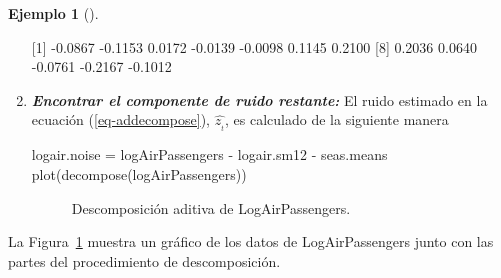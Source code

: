 \documentclass[
  us-letterpaper,
]{scrreprt}
\newenvironment{Shaded}{\begin{snugshade}}{\end{snugshade}}
\newcommand{\DecValTok}[1]{\textcolor[rgb]{0.68,0.00,0.00}{#1}}
\newcommand{\FloatTok}[1]{\textcolor[rgb]{0.68,0.00,0.00}{#1}}
\newcommand{\FunctionTok}[1]{\textcolor[rgb]{0.28,0.35,0.67}{#1}}
\newcommand{\NormalTok}[1]{\textcolor[rgb]{0.00,0.23,0.31}{#1}}
\newcommand{\OtherTok}[1]{\textcolor[rgb]{0.00,0.23,0.31}{#1}}
\newcommand{\SpecialCharTok}[1]{\textcolor[rgb]{0.37,0.37,0.37}{#1}}
\theoremstyle{plain}
\theoremstyle{definition}
\theoremstyle{definition}
\newtheorem{example}{Ejemplo}[chapter]
\theoremstyle{plain}
\theoremstyle{remark}
\begin{document}
\begin{example}[]
\begin{tcolorbox}
\begin{enumerate}
\begin{Shaded}
\begin{Highlighting}[]
\NormalTok{[}\DecValTok{1}\NormalTok{] }\SpecialCharTok{{-}}\FloatTok{0.0867} \SpecialCharTok{{-}}\FloatTok{0.1153}  \FloatTok{0.0172} \SpecialCharTok{{-}}\FloatTok{0.0139} \SpecialCharTok{{-}}\FloatTok{0.0098}  \FloatTok{0.1145}  \FloatTok{0.2100}
\NormalTok{[}\DecValTok{8}\NormalTok{]  }\FloatTok{0.2036}  \FloatTok{0.0640} \SpecialCharTok{{-}}\FloatTok{0.0761} \SpecialCharTok{{-}}\FloatTok{0.2167} \SpecialCharTok{{-}}\FloatTok{0.1012}
\end{Highlighting}
\end{Shaded}
\item
  \textbf{\emph{Encontrar el componente de ruido restante:}} El ruido
  estimado en la ecuación (\ref{eq-addecompose}), \(\hat{z_{_t}}\), es
  calculado de la siguiente manera

\begin{Shaded}
\begin{Highlighting}[]
\NormalTok{logair.noise }\OtherTok{=}\NormalTok{ logAirPassengers }\SpecialCharTok{{-}}\NormalTok{ logair.sm12 }\SpecialCharTok{{-}}\NormalTok{ seas.means}
\FunctionTok{plot}\NormalTok{(}\FunctionTok{decompose}\NormalTok{(logAirPassengers))}
\end{Highlighting}
\end{Shaded}

  \begin{figure}[H]


  \caption{\label{fig-descaddp}Descomposición aditiva de
  LogAirPassengers.}

  \end{figure}%
\end{enumerate}

La Figura~\ref{fig-descaddp} muestra un gráfico de los datos de
LogAirPassengers junto con las partes del procedimiento de
descomposición.

\end{tcolorbox}

\end{example}
\end{document}
